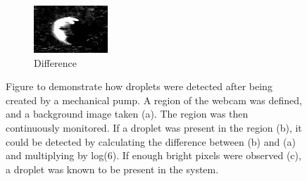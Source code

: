 \documentclass{physics_article_B}
\begin{document}
\begin{figure}[H]
\begin{subfigure}[b]{0.3\textwidth}
                            \includegraphics[width=\textwidth]{Figures/DropFinder/DropFinder3.eps}
                            \caption{Difference}
                            \label{fig:detector:diff}
                        \end{subfigure}
                        \caption{Figure to demonstrate how droplets were detected after being created by a mechanical pump. A region of the webcam was defined, and a background image taken (a). The region was then continuously monitored. If a droplet was present in the region (b), it could be detected by calculating the difference between (b) and (a) and multiplying by log(6). If enough bright pixels were observed (c), a droplet was known to be present in the system.}\label{fig:detector}
                    \end{figure}
            
\end{document}
